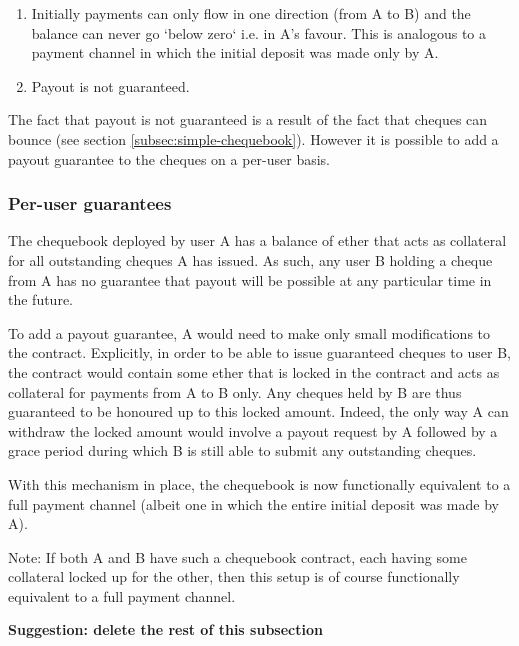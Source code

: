 \begin{enumerate}
    \item Initially payments can only flow in one direction (from A to B) and the balance can never go `below zero` i.e. in A's favour. This is analogous to a payment channel in which the initial deposit was made only by A.
    \item Payout is not guaranteed. 
\end{enumerate}

The fact that payout is not guaranteed is a result of the fact that cheques can bounce (see section \ref{subsec:simple-chequebook}). However it is possible to add a payout guarantee to the cheques on a per-user basis.

\subsubsection{Per-user guarantees}

The chequebook deployed by user A has a balance of ether that acts as collateral for all outstanding cheques A has issued. As such, any user B holding a cheque from A has no guarantee that payout will be possible at any particular time in the future. 

To add a payout guarantee, A would need to make only small modifications to the contract. Explicitly, in order to be able to issue guaranteed cheques to user B, the contract would contain some ether that is locked in the contract and acts as collateral for payments from A to B only. Any cheques held by B are thus guaranteed to be honoured up to this locked amount. Indeed, the only way A can withdraw the locked amount would involve a payout request by A followed by a grace period during which B is still able to submit any outstanding cheques.

With this mechanism in place, the chequebook is now functionally equivalent to a full payment channel (albeit one in which the entire initial deposit was made by A).

Note: If both A and B have such a chequebook contract, each having some collateral locked up for the other, then this setup is of course functionally equivalent to a full payment channel.


\textbf{Suggestion: delete the rest of this subsection}


